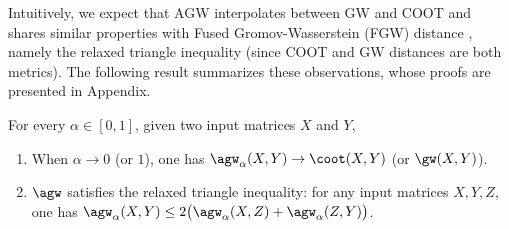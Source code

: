 Intuitively, we expect that AGW interpolates between GW and COOT and shares similar properties
with Fused Gromov-Wasserstein (FGW) distance \citep{Vayer19b}, namely
the relaxed triangle inequality (since COOT and GW distances are both metrics).
The following result summarizes these observations, whose proofs are presented in
Appendix.
\begin{proposition}
\label{prop:basic_prop}
For every $\alpha \in [0, 1]$, given two input matrices $X$ and $Y$,
\begin{enumerate}
    \item When $\alpha \to 0$ (or $1$), one has $\agw_{\alpha}(X, Y) \to \coot(X, Y)$ (or $\gw(X, Y)$).

    \item $\agw$ satisfies the relaxed triangle inequality: for any input matrices $X, Y, Z$,
    one has $\agw_{\alpha}(X, Y) \leq 2 \big( \agw_{\alpha}(X, Z) + \agw_{\alpha}(Z, Y) \big)$.
\end{enumerate}
\end{proposition}

